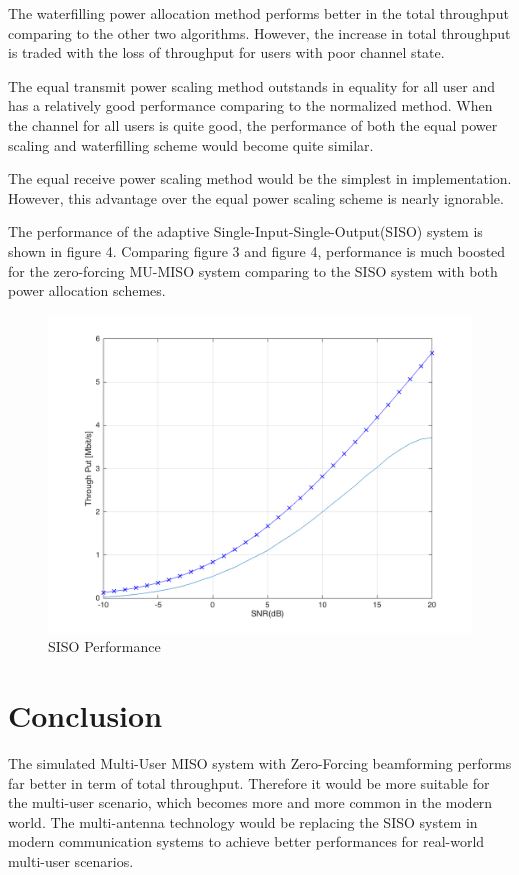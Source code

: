 \documentclass{article}
\begin{document}
\noindent
The waterfilling power allocation method performs better in the total throughput comparing to the other two algorithms.
However, the increase in total throughput is traded with the loss of throughput for users with poor channel state.

\noindent
The equal transmit power scaling method outstands in equality for all user and has a relatively good performance comparing to the normalized method.
When the channel for all users is quite good, the performance of both the equal power scaling and waterfilling scheme would become quite similar.

\noindent
The equal receive power scaling method would be the simplest in implementation. However, this advantage over the equal power scaling scheme is nearly ignorable.

\noindent
The performance of the adaptive Single-Input-Single-Output(SISO) system is shown in figure 4. Comparing figure 3 and figure 4,
 performance is much boosted for the zero-forcing MU-MISO system comparing to the SISO system with both power allocation schemes.
\begin{figure}[ht]
\centering
\includegraphics[scale=0.4]{FadingSISO.png}
\caption{SISO Performance}
\label{fig:SISO}
\end{figure}


\section{Conclusion}
The simulated Multi-User MISO system with Zero-Forcing beamforming performs far better in term of total throughput. Therefore it would be
more suitable for the multi-user scenario, which becomes more and more common in the modern world.
The multi-antenna technology would be replacing the SISO system in modern communication systems to achieve better performances for
real-world multi-user scenarios.
\end{document}
